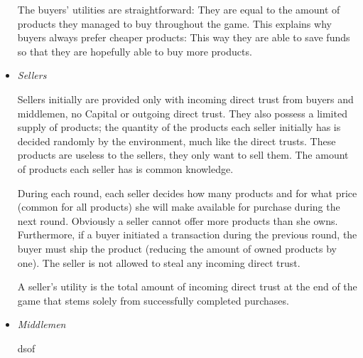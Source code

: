 \begin{itemize}
    The buyers' utilities are straightforward: They are equal to the amount of products they managed to buy throughout the
    game. This explains why buyers always prefer cheaper products: This way they are able to save funds so that they are
    hopefully able to buy more products.

    \item \textit{Sellers}

    Sellers initially are provided only with incoming direct trust from buyers and middlemen, no Capital or outgoing direct
    trust. They also possess a limited supply of products; the quantity of the products each seller initially has is decided
    randomly by the environment, much like the direct trusts. These products are useless to the sellers, they only want to
    sell them. The amount of products each seller has is common knowledge.
    
    During each round, each seller decides how many products and for what price (common for all products) she will make
    available for purchase during the next round. Obviously a seller cannot offer more products than she owns. Furthermore, if
    a buyer initiated a transaction during the previous round, the buyer must ship the product (reducing the amount of owned
    products by one). The seller is not allowed to steal any incoming direct trust.

    A seller's utility is the total amount of incoming direct trust at the end of the game that stems solely from successfully
    completed purchases.

    \item \textit{Middlemen}

    dsof
  \end{itemize}
